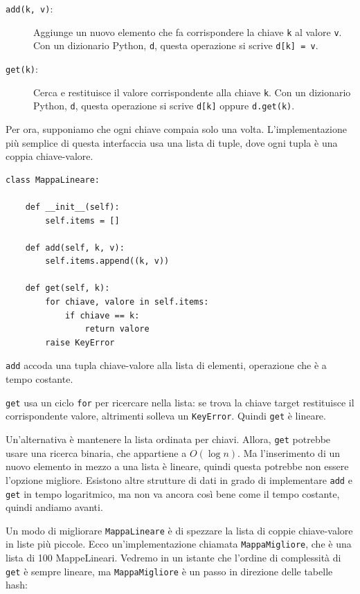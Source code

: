 \documentclass[10pt]{book}
\begin{document}
\begin{description}

\item[{\tt add(k, v)}:] Aggiunge un nuovo elemento che fa corrispondere la chiave {\tt k} al valore {\tt v}.  Con un dizionario Python, {\tt d}, questa operazione si scrive {\tt d[k] = v}.

\item[{\tt get(k)}:] Cerca e restituisce il valore corrispondente alla chiave {\tt k}.  Con un dizionario Python, {\tt d}, questa operazione si scrive {\tt d[k]} oppure {\tt d.get(k)}.

\end{description}

Per ora, supponiamo che ogni chiave compaia solo una volta. L'implementazione più semplice di questa interfaccia usa una lista di tuple, dove ogni tupla è una coppia chiave-valore.

\begin{verbatim}
class MappaLineare:

    def __init__(self):
        self.items = []

    def add(self, k, v):
        self.items.append((k, v))

    def get(self, k):
        for chiave, valore in self.items:
            if chiave == k:
                return valore
        raise KeyError
\end{verbatim}

{\tt add} accoda una tupla chiave-valore alla lista di elementi, operazione che è a tempo costante.

{\tt get} usa un ciclo {\tt for} per ricercare nella lista: se trova la chiave target restituisce il corrispondente valore, altrimenti solleva un {\tt KeyError}. Quindi {\tt get} è lineare.

Un'alternativa è mantenere la lista ordinata per chiavi. Allora, {\tt get}
potrebbe usare una ricerca binaria, che appartiene a $O(\log n)$. Ma l'inserimento di un nuovo elemento in mezzo a una lista è lineare, quindi questa potrebbe non essere l'opzione migliore. Esistono altre strutture di dati in grado di implementare {\tt add} e {\tt get} in tempo logaritmico, ma non va ancora così bene come il tempo costante, quindi andiamo avanti.
  

Un modo di migliorare {\tt MappaLineare} è di spezzare la lista di coppie chiave-valore in liste più piccole. Ecco un'implementazione chiamata
{\tt MappaMigliore}, che è una lista di 100 MappeLineari.  Vedremo in un istante che l'ordine di complessità di {\tt get} è sempre lineare, ma {\tt MappaMigliore} è un passo in direzione delle tabelle hash:
\end{document}
